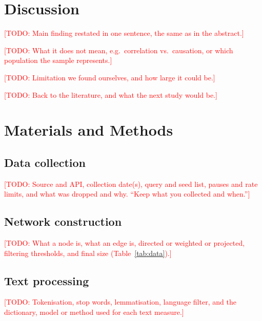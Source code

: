 \documentclass[9pt,twocolumn,twoside,lineno]{pnas-new}
\newcommand{\todo}[1]{\textcolor{red}{[TODO: #1]}}
\begin{document}
\section*{Discussion}

\todo{Main finding restated in one sentence, the same as in the abstract.}

\todo{What it does not mean, e.g.\ correlation vs.\ causation, or which population the sample represents.}

\todo{Limitation we found ourselves, and how large it could be.}

\todo{Back to the literature, and what the next study would be.}

\section*{Materials and Methods}

\subsection*{Data collection}
\todo{Source and API, collection date(s), query and seed list, pauses and rate limits, and what was dropped and why. ``Keep what you collected and when.''}

\subsection*{Network construction}
\todo{What a node is, what an edge is, directed or weighted or projected, filtering thresholds, and final size (Table~\ref{tab:data}).}

\subsection*{Text processing}
\todo{Tokenisation, stop words, lemmatisation, language filter, and the dictionary, model or method used for each text measure.}
\end{document}
